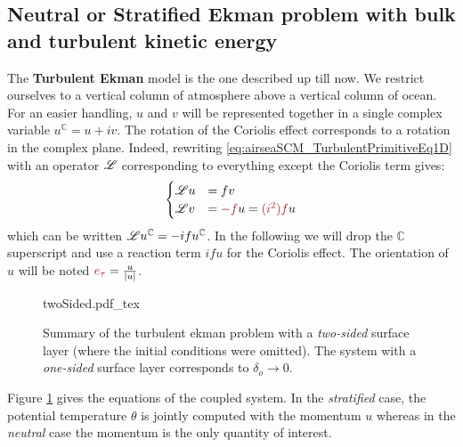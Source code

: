 \subsection{Neutral or Stratified Ekman problem with bulk and turbulent kinetic energy}
\label{sec:airseaSCM_hierarchy_TurbulentEkman}
The \textbf{Turbulent Ekman} model is the one described up till now.
We restrict ourselves to a vertical column of atmosphere
above a vertical column of ocean.
For an easier handling, $u$ and $v$ will be represented together in
a single complex variable $u^{\mathbb{C}} = u+iv$.
The rotation of the Coriolis effect corresponds to
a rotation in the complex plane.
Indeed, rewriting \eqref{eq:airseaSCM_TurbulentPrimitiveEq1D}
with an operator ${\cal L}$ corresponding to everything except
the Coriolis term gives:
\begin{equation}
	\label{eq:airseaSCM_complexForm}
\begin{cases}
	{\cal L}u &= fv\\
	{\cal L}v &= \emphase{- f}u = \emphase{(i^2) f} u
\end{cases}
\end{equation}
which can be written ${\cal L}u^{\mathbb{C}} = -i f u^\mathbb{C}$.
In the following we will drop the ${\mathbb{C}}$ superscript
and use a reaction term $ifu$ for the Coriolis effect. The
orientation of $u$ will be noted $\emphase{e_\tau} = \frac{u}{|u|}$.
\begin{figure}[h]
	\centering
	{twoSided.pdf_tex}
	\caption{Summary
	of the turbulent ekman problem with a
	\textit{two-sided} surface layer (where
	the initial conditions were omitted). The 
	system with a \textit{one-sided} surface layer corresponds
	to $\delta_o \rightarrow 0$.
	}
	\label{fig:airseaSCM_twoSidedBulk_drawing}
\end{figure}
Figure \ref{fig:airseaSCM_twoSidedBulk_drawing} gives
the equations of the coupled system. In the \textit{stratified}
case, the potential temperature $\theta$ is jointly computed with the
momentum $u$ whereas in the \textit{neutral} case the momentum
is the only quantity of interest.
